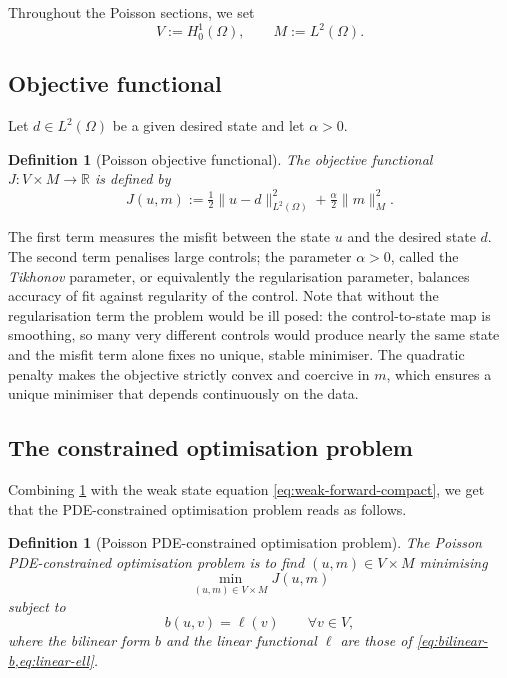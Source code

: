 \documentclass[a4paper,11pt]{article}
\newcommand{\R}{\mathbb{R}}
\newcommand{\Om}{\Omega}
\newcommand{\Lp}[1]{L^{2}(#1)}              %
\newcommand{\Mspace}{M}
\theoremstyle{spacedplain} \newtheorem{theorem}[counter]{Theorem} \newtheorem{lemma}[counter]{Lemma} \newtheorem{prop}[counter]{Proposition} \newtheorem{cor}[counter]{Corollary}
\theoremstyle{spaceddefinition} \newtheorem{defn}[counter]{Definition} \newtheorem{example}[counter]{Example} \newtheorem{remark}[counter]{Remark}
\begin{document}
Throughout the Poisson sections, we set
\begin{equation}
  \label{eq:VM-spaces}
  V := H_0^1(\Om),
  \qquad
  \Mspace := \Lp{\Om}.
\end{equation}

\subsection{Objective functional}
\label{sec:opt:objective}

Let $d \in \Lp{\Om}$ be a given desired state and let $\alpha > 0$.

\begin{defn}[Poisson objective functional]
\label{defn:objective} The \emph{objective functional} $J : V \times \Mspace \to \R$ is defined by
\begin{equation}
  \label{eq:objective-J}
  J(u, m)
  := \tfrac{1}{2} \|u - d\|_{\Lp{\Om}}^2
  + \tfrac{\alpha}{2} \|m\|_{\Mspace}^2.
\end{equation}
\end{defn}

The first term measures the misfit between the state $u$ and the desired state $d$. The second term penalises large controls; the parameter $\alpha > 0$, called the \emph{Tikhonov} parameter, or equivalently the regularisation parameter, balances accuracy of fit against regularity of the control. Note that without the regularisation term the problem would be ill posed: the control-to-state map is smoothing, so many very different controls would produce nearly the same state and the misfit term alone fixes no unique, stable minimiser. The quadratic penalty makes the objective strictly convex and coercive in $m$, which ensures a unique minimiser that depends continuously on the data.

\subsection{The constrained optimisation problem}
\label{sec:opt:constrained}

Combining \cref{defn:objective} with the weak state equation \cref{eq:weak-forward-compact}, we get that the PDE-constrained optimisation problem reads as follows.

\begin{defn}[Poisson PDE-constrained optimisation problem]
\label{defn:full-problem} The \emph{Poisson PDE-constrained optimisation problem} is to find $(u, m) \in V \times \Mspace$ minimising
\begin{equation}
  \min_{(u, m) \in V \times \Mspace} J(u, m)
\end{equation}
subject to
\begin{equation}
  b(u, v) = \ell(v) \qquad \forall v \in V,
\end{equation}
where the bilinear form $b$ and the linear functional $\ell$ are those of \cref{eq:bilinear-b,eq:linear-ell}.
\end{defn}
\end{document}
